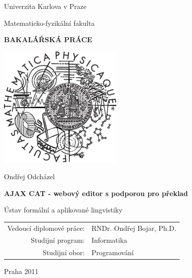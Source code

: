 \documentclass[12pt,a4paper]{report}
\begin{document}


\pagestyle{empty}
\begin{center}

\large

Univerzita Karlova v Praze

\medskip

Matematicko-fyzikální fakulta

\vfill

{\bf\Large BAKALÁŘSKÁ PRÁCE}

\vfill

\centerline{\mbox{\includegraphics[width=60mm]{logo.eps}}}

\vfill
\vspace{5mm}

{\LARGE Ondřej Odcházel}

\vspace{15mm}

{\LARGE\bfseries AJAX CAT - webový editor s podporou pro překlad}

\vfill

Ústav formální a aplikované lingvistiky

\vfill

\begin{tabular}{rl}

Vedoucí diplomové práce: & RNDr. Ondřej Bojar, Ph.D. \\
\noalign{\vspace{2mm}}
Studijní program: & Informatika \\
\noalign{\vspace{2mm}}
Studijní obor: & Programování \\
\end{tabular}

\vfill

Praha 2011

\end{center}
\end{document}
